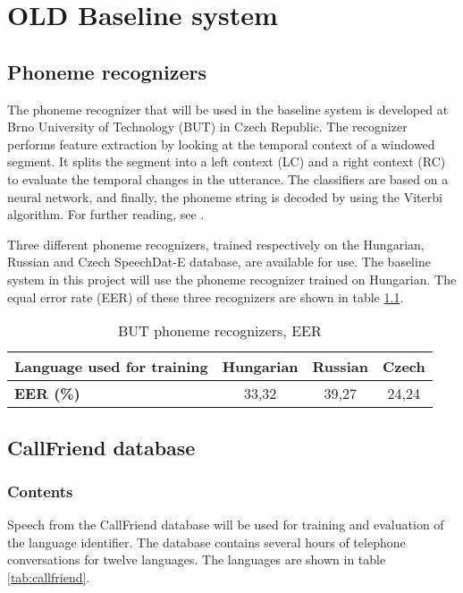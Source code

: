 \chapter{OLD Baseline system}
\label{baseline}
\label{chapterthree}

\section{Phoneme recognizers}\label{chap:phnrec}
The phoneme recognizer that will be used in the baseline system is developed at Brno University of Technology (BUT) in Czech Republic. The recognizer performs feature extraction by looking at the temporal context of a windowed segment. It splits the segment into a left context (LC) and a right context (RC) to evaluate the temporal changes in the utterance. The classifiers are based on a neural network, and finally, the phoneme string is decoded by using the Viterbi algorithm. For further reading, see \cite{phnrec}.

Three different phoneme recognizers, trained respectively on the Hungarian, Russian and Czech SpeechDat-E database, are available for use. The baseline system in this project will use the phoneme recognizer trained on Hungarian. The equal error rate (EER) of these three recognizers are shown in table \ref{tab:phnrec}.

\begin{table}[h!b!t!]
	\begin{center}
	\caption{BUT phoneme recognizers, EER}
	\begin{tabular}{ | l | c | c | c |}
		\hline
		\textbf{Language used for training} & \textbf{Hungarian} & \textbf{Russian} & \textbf{Czech}  \\ \hline 
		\textbf{EER (\%) } & 33,32 & 39,27 &  24,24  \\ 
		\hline
	\end{tabular}
	\label{tab:phnrec}
	\end{center}
\end{table}

\section{CallFriend database}
\subsection{Contents}\label{chap:callfriend}
Speech from the CallFriend database will be used for training and evaluation of the language identifier. The database contains several hours of telephone conversations for twelve languages. The languages are shown in table \ref{tab:callfriend}.

